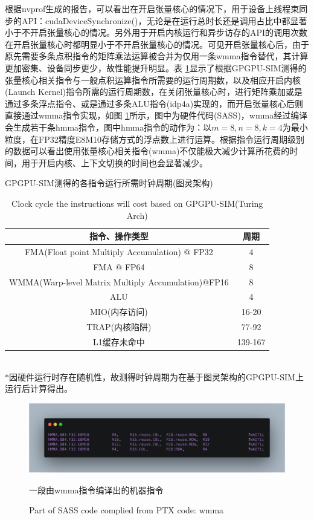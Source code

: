\par 根据nvprof生成的报告，可以看出在开启张量核心的情况下，用于设备上线程束同步的API：cudaDeviceSynchronize()，无论是在运行总时长还是调用占比中都显著小于不开启张量核心的情况。另外用于开启内核运行和异步访存的API的调用次数在开启张量核心时都明显小于不开启张量核心的情况。可见开启张量核心后，由于原先需要多条点积指令的矩阵乘法运算被合并为仅用一条wmma指令替代，其计算更加密集、设备同步更少，故性能提升明显。表 \ref{table-时钟周期}显示了根据GPGPU-SIM测得的张量核心相关指令与一般点积运算指令所需要的运行周期数，以及相应开启内核(Launch Kernel)指令所需的运行周期数，在关闭张量核心时，进行矩阵乘加或是通过多条浮点指令、或是通过多条ALU指令(idp4a)实现的，而开启张量核心后则直接通过wmma指令实现，如图 \ref{Fig.HMMASASS}所示，图中为硬件代码(SASS)，wmma经过编译会生成若干条hmma指令，图中hmma指令的动作为：以$ m=8,n=8,k=4 $为最小粒度，在FP32精度E8M10存储方式的浮点数上进行运算。根据指令运行周期级别的数据可以看出使用张量核心相关指令(wmma)不仅能极大减少计算所花费的时间，用于开启内核、上下文切换的时间也会显著减少。
\begin{table}
	\centering
	\renewcommand{\thetable}{\arabic{section}-\arabic{table} }
	\renewcommand{\tablename}{表}
	\caption{GPGPU-SIM测得的各指令运行所需时钟周期(图灵架构)}
	\addtocounter{table}{-1}
	\renewcommand{\thetable}{\arabic{section}-\arabic{table} }
	\renewcommand{\tablename}{Table}
	\caption{Clock cycle the instructions will cost based on GPGPU-SIM(Turing Arch)}
	\begin{tabular}{cc}
		\toprule
		指令、操作类型	&	周期\\
		\midrule
		FMA(Float point Multiply Accumulation) @ FP32 & 4 \\
		FMA @ FP64	&	8\\
		WMMA(Warp-level Matrix Multiply Accumulation)@FP16 & 8\\
		ALU 	&	4\\
		MIO(内存访问) & 16-20\\
		TRAP(内核陷阱) & 77-92\\
		L1缓存未命中 & 139-167\\
		\bottomrule
	\end{tabular} \label{table-时钟周期} \\
	
	$ * $因硬件运行时存在随机性，故测得时钟周期为在基于图灵架构的GPGPU-SIM上运行后计算得出。
\end{table}
\begin{figure}
	\centering
	\includegraphics[width=15cm]{figures/HMMASASS.jpg}
	\renewcommand{\thefigure}{\arabic{section}-\arabic{figure} }
	\renewcommand{\figurename}{图}
	\caption{一段由wmma指令编译出的机器指令}
	\addtocounter{figure}{-1}
	\renewcommand{\thefigure}{\arabic{section}-\arabic{figure} }
	\renewcommand{\figurename}{Figure}
	\caption{Part of SASS code complied from PTX code: wmma}
	\label{Fig.HMMASASS}
\end{figure}
